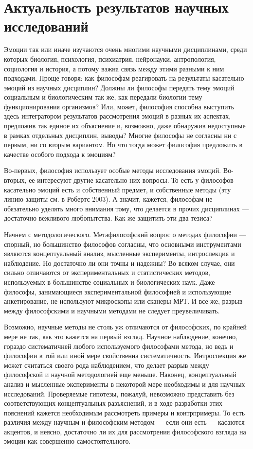 \documentclass[11pt]{book}
\begin{document}
\section{Актуальность результатов научных исследований}

Эмоции так или иначе изучаются очень многими научными дисциплинами, среди которых биология, психология, психиатрия, нейронауки, антропология, социология и история, а потому важна связь между этими разными к ним подходами. Проще говоря: как философам реагировать на результаты касательно эмоций из научных дисциплин? Должны ли философы передать тему эмоций социальным и биологическим так же, как передали биологии тему функционирования организмов? Или, может, философия способна выступить здесь интегратором результатов рассмотрения эмоций в разных их аспектах, предложив так единое их объяснение и, возможно, даже обнаружив недоступные в рамках отдельных дисциплин, выводы? Многие философы не согласны ни с первым, ни со вторым вариантом. Но что тогда может философия предложить в качестве особого подхода к эмоциям?

Во-первых, философия использует особые методы исследования эмоций. Во-вторых, ее интересуют другие касательно них вопросы. То есть у философов касательно эмоций есть и собственный предмет, и собственные методы (эту линию защиты см. в Робертс 2003). А значит, кажется, философам не обязательно уделять много внимания тому, что делается в прочих дисциплинах --- достаточно вежливого любопытства. Как же защитить эти два тезиса?

Начнем с методологического. Метафилософский вопрос о методах философии --- спорный, но большинство философов согласны, что основными инструментами являются концептуальный анализ, мысленные эксперименты, интроспекция и наблюдение. Но достаточно ли они точны и надежны? Во всяком случае, они сильно отличаются от экспериментальных и статистических методов, используемых в большинстве социальных и биологических наук. Даже философы, занимающиеся экспериментальной философией и использующие анкетирование, не используют микроскопы или сканеры МРТ. И все же, разрыв между философскими и научными методами не следует преувеличивать.

Возможно, научные методы не столь уж отличаются от философских, по крайней мере не так, как это кажется на первый взгляд. Научное наблюдение, конечно, гораздо систематичней любого используемого философами метода, но ведь и философии в той или иной мере свойственна систематичность. Интроспекция же может считаться своего рода наблюдением, что делает разрыв между философской и научной методологией еще меньше. Наконец, концептуальный анализ и мысленные эксперименты в некоторой мере необходимы и для научных исследований. Проверяемые гипотезы, пожалуй, невозможно представить без соответствующих концептуальных разъяснений, и в ходе разработки этих пояснений кажется необходимым рассмотреть примеры и контрпримеры. То есть различия между научным и философским методом --- если они есть --- касаются акцентов, и неясно, достаточно ли их для рассмотрения философского взгляда на эмоции как совершенно самостоятельного.
\end{document}
